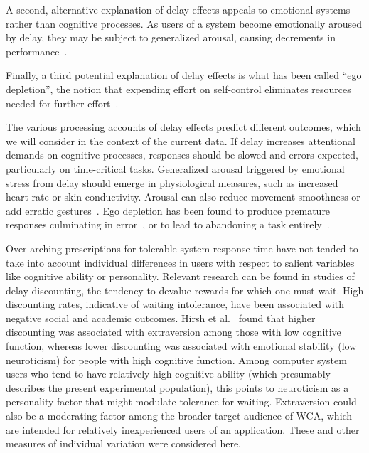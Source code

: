 \documentclass[10pt,letterpaper]{article}
\providecommand{\DIFaddtex}[1]{#1} %
\providecommand{\DIFdeltex}[1]{} %
\providecommand{\DIFaddbegin}{\protect\color{blue}} %
\providecommand{\DIFaddend}{\protect\color{black}} %
\providecommand{\DIFdelbegin}{\protect\color{red}} %
\providecommand{\DIFdelend}{\protect\color{black}} %
\providecommand{\DIFadd}[1]{\texorpdfstring{\DIFaddtex{#1}}{#1}} %
\providecommand{\DIFdel}[1]{\texorpdfstring{\DIFdeltex{#1}}{}} %
\newcommand{\DIFscaledelfig}{0.5}
\newlength{\DIFdelgraphicswidth} %
\newlength{\DIFdelgraphicsheight} %
\newcommand{\DIFaddincludegraphics}[2][]{{\color{blue}\fbox{\DIFOincludegraphics[#1]{#2}}}} %
\newcommand{\DIFdelincludegraphics}[2][]{%
\sbox{\DIFdelgraphicsbox}{\DIFOincludegraphics[#1]{#2}}%
\settoboxwidth{\DIFdelgraphicswidth}{\DIFdelgraphicsbox} %
\settoboxtotalheight{\DIFdelgraphicsheight}{\DIFdelgraphicsbox} %
\scalebox{\DIFscaledelfig}{%
\parbox[b]{\DIFdelgraphicswidth}{\usebox{\DIFdelgraphicsbox}\\[-\baselineskip] \rule{\DIFdelgraphicswidth}{0em}}\llap{\resizebox{\DIFdelgraphicswidth}{\DIFdelgraphicsheight}{%
\setlength{\unitlength}{\DIFdelgraphicswidth}%
\begin{picture}(1,1)%
\thicklines\linethickness{2pt} %
{\color[rgb]{1,0,0}\put(0,0){\framebox(1,1){}}}%
{\color[rgb]{1,0,0}\put(0,0){\line( 1,1){1}}}%
{\color[rgb]{1,0,0}\put(0,1){\line(1,-1){1}}}%
\end{picture}%
}\hspace*{3pt}}} %
} %
\DeclareRobustCommand{\DIFaddbegin}{\DIFOaddbegin \let\includegraphics\DIFaddincludegraphics} %
\DeclareRobustCommand{\DIFaddend}{\DIFOaddend \let\includegraphics\DIFOincludegraphics} %
\DeclareRobustCommand{\DIFdelbegin}{\DIFOdelbegin \let\includegraphics\DIFdelincludegraphics} %
\DeclareRobustCommand{\DIFdelend}{\DIFOaddend \let\includegraphics\DIFOincludegraphics} %
\begin{document}
\DIFdelbegin \DIFdel{An alternative view }\DIFdelend \DIFaddbegin \DIFadd{A second, alternative explanation }\DIFaddend of delay effects appeals to emotional systems rather than cognitive processes.
As users of a system become emotionally aroused by delay, they may be subject to generalized arousal, causing decrements in performance~\cite{lee2019limiting}.

\DIFdelbegin \DIFdel{A }\DIFdelend \DIFaddbegin \DIFadd{Finally, a }\DIFaddend third potential explanation of delay effects is what has been called ``ego depletion'', the notion that expending effort on self-control eliminates resources needed for further effort~\cite{baumeister74tice,lin2020strong}.

The various processing accounts of delay effects predict different outcomes, which we will consider in the context of the current data.
If delay increases attentional demands on cognitive processes, responses should be slowed and errors expected, particularly on time-critical tasks.
Generalized arousal triggered by emotional stress from delay should emerge in physiological measures, such as increased heart rate or skin conductivity.
Arousal can also reduce movement smoothness or add erratic gestures~\cite{pijpers2003anxiety}.
Ego depletion has been found to produce premature responses culminating in error~\cite{lin2020strong}, or to lead to abandoning a task entirely~\cite{baumeister74tice}. 

Over-arching prescriptions for tolerable system response time have not tended to take into account individual differences in users with respect to salient variables like cognitive ability or personality. 
Relevant research can be found in studies of delay discounting, the tendency to devalue rewards for which one must wait.
High discounting rates, indicative of waiting intolerance, have been associated with negative social and academic outcomes.
Hirsh et al.~\cite{hirsh2008delay} found that higher discounting was associated with extraversion among those with low cognitive function, whereas lower discounting was associated with emotional stability (low neuroticism) for people with high cognitive function.
Among computer system users who tend to have relatively high cognitive ability (which presumably describes the present experimental population), this points to neuroticism as a personality factor that might modulate tolerance for waiting. Extraversion could also  be  a moderating factor among the broader target audience of WCA, which are intended for relatively inexperienced users of an application.
These and other measures of individual variation were considered here.
\end{document}
